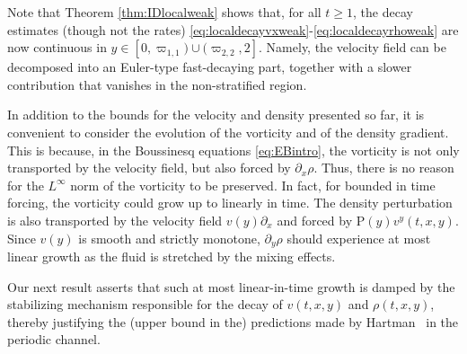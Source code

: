 \documentclass[11pt,reqno]{amsproc}
\theoremstyle{definition}
\numberwithin{equation}{section}
\begin{document}
Note that Theorem \ref{thm:IDlocalweak} shows that, for all $t\geq 1$, the decay estimates (though not the rates) \eqref{eq:localdecayvxweak}-\eqref{eq:localdecayrhoweak} are now continuous in $y\in [0,\varpi_{1,1})\cup (\varpi_{2,2},2]$. Namely, the velocity field can be decomposed into an Euler-type fast-decaying part, together with a slower contribution that vanishes in the non-stratified region. 

In addition to the bounds for the velocity and density presented so far, it is convenient to consider the evolution of the vorticity and of the density gradient.
This is because, in the Boussinesq equations \eqref{eq:EBintro}, the vorticity is not only transported by the velocity field, but also forced by $\partial_x\rho$. Thus, there is no reason for the $L^\infty$ norm of the vorticity to be preserved. In fact, for bounded in time forcing, the vorticity could grow up to linearly in time. The density perturbation is also transported by the velocity field $v(y)\partial_x$ and forced by $\mathrm{P}(y)v^y(t,x,y)$. Since $v(y)$ is smooth and strictly monotone, $\partial_y\rho$ should experience at most linear growth as the fluid is stretched by the mixing effects. 

Our next result asserts that such at most linear-in-time growth is damped by the stabilizing mechanism responsible for the decay of  $v(t,x,y)$ and $\rho(t,x,y)$, thereby  justifying the (upper bound in the) predictions made by Hartman~\cite{Hartman} in the periodic channel.
\end{document}
